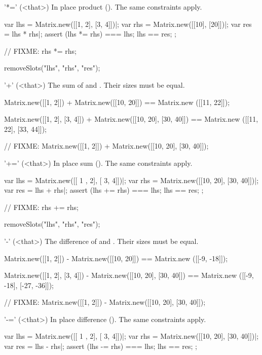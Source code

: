 \begin{urbiscriptapi}
\item['*='](<that>)%
  In place product ().  The same constraints apply.
\begin{urbiscript}
var lhs = Matrix.new([[1, 2], [3, 4]])|;
var rhs = Matrix.new([[10], [20]])|;
var res = lhs * rhs|;
assert
{
  (lhs *= rhs) === lhs;
  lhs == res;
};

// FIXME: rhs *= rhs;
\end{urbiscript}
\begin{urbicomment}
  removeSlots("lhs", "rhs", "res");
\end{urbicomment}


\item['+'](<that>)%
  The sum of \this and \that.  Their sizes must be equal.
\begin{urbiassert}
Matrix.new([[1, 2]]) + Matrix.new([[10, 20]])
  == Matrix.new ([[11, 22]]);

Matrix.new([[1, 2], [3, 4]]) + Matrix.new([[10, 20], [30, 40]])
  == Matrix.new ([[11, 22], [33, 44]]);

// FIXME: Matrix.new([[1, 2]]) + Matrix.new([[10, 20], [30, 40]]);
\end{urbiassert}

\item['+='](<that>)%
  In place sum ().   The same constraints apply.
\begin{urbiscript}
var lhs = Matrix.new([[ 1 , 2], [ 3,  4]])|;
var rhs = Matrix.new([[10, 20], [30, 40]])|;
var res = lhs + rhs|;
assert
{
  (lhs += rhs) === lhs;
  lhs == res;
};

// FIXME: rhs += rhs;
\end{urbiscript}
\begin{urbicomment}
  removeSlots("lhs", "rhs", "res");
\end{urbicomment}

\item['-'](<that>)%
  The difference of \this and \that.  Their sizes must be equal.
\begin{urbiassert}
Matrix.new([[1, 2]]) - Matrix.new([[10, 20]])
  == Matrix.new ([[-9, -18]]);

Matrix.new([[1, 2], [3, 4]]) - Matrix.new([[10, 20], [30, 40]])
  == Matrix.new ([[-9, -18], [-27, -36]]);

// FIXME: Matrix.new([[1, 2]]) - Matrix.new([[10, 20], [30, 40]]);
\end{urbiassert}


\item['-='](<that>)%
  In place difference ().  The same constraints apply.
\begin{urbiscript}
var lhs = Matrix.new([[ 1 , 2], [ 3,  4]])|;
var rhs = Matrix.new([[10, 20], [30, 40]])|;
var res = lhs - rhs|;
assert
{
  (lhs -= rhs) === lhs;
  lhs == res;
};


\end{urbiscript}
\end{urbiscriptapi}
